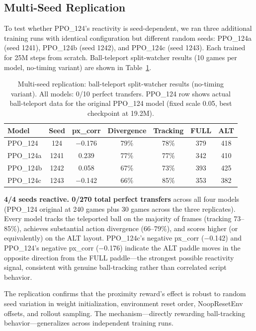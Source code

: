 \documentclass[11pt]{article}
\begin{document}
\subsection{Multi-Seed Replication}
\label{sec:replication}

To test whether PPO\_124's reactivity is seed-dependent, we ran three
additional training runs with identical configuration but different random
seeds: PPO\_124a (seed 1241), PPO\_124b (seed 1242), and PPO\_124c (seed
1243). Each trained for 25M steps from scratch. Ball-teleport split-watcher
results (10 games per model, no-timing variant) are shown in
Table~\ref{tab:replication}.

\begin{table}[ht]
\centering
\begin{tabular}{lcccccc}
\toprule
\textbf{Model} & \textbf{Seed} & \textbf{px\_corr} & \textbf{Divergence} &
\textbf{Tracking} & \textbf{FULL} & \textbf{ALT} \\
\midrule
PPO\_124  & 124  & $-$0.176 & 79\% & 78\% & 379 & 418 \\
PPO\_124a & 1241 & 0.239    & 77\% & 77\% & 342 & 410 \\
PPO\_124b & 1242 & 0.058    & 67\% & 73\% & 393 & 425 \\
PPO\_124c & 1243 & $-$0.142 & 66\% & 85\% & 353 & 382 \\
\bottomrule
\end{tabular}
\caption{Multi-seed replication: ball-teleport split-watcher results
(no-timing variant). All models: 0/10 perfect transfers. PPO\_124 row shows
actual ball-teleport data for the original PPO\_124 model (fixed scale 0.05,
best checkpoint at 19.2M).}
\label{tab:replication}
\end{table}

\textbf{4/4 seeds reactive. 0/270 total perfect transfers} across all four
models (PPO\_124 original at 240 games plus 30 games across the three
replicates). Every model tracks the teleported ball on the majority of frames
(tracking 73--85\%), achieves substantial action divergence (66--79\%), and
scores higher (or equivalently) on the ALT layout. PPO\_124c's negative
px\_corr ($-$0.142) and PPO\_124's negative px\_corr ($-$0.176) indicate the
ALT paddle moves in the opposite direction from the FULL paddle---the strongest
possible reactivity signal, consistent with genuine ball-tracking rather than
correlated script behavior.

The replication confirms that the proximity reward's effect is robust to
random seed variation in weight initialization, environment reset order,
NoopResetEnv offsets, and rollout sampling. The mechanism---directly rewarding
ball-tracking behavior---generalizes across independent training runs.
\end{document}
